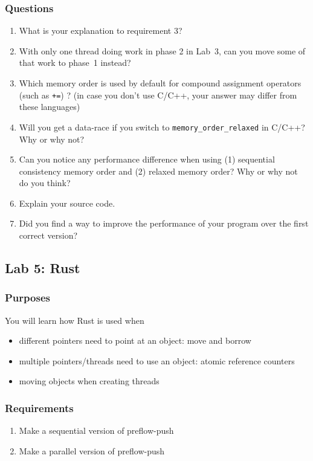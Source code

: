 \documentclass{forsete}
\begin{document}
\subsubsection*{Questions}
\begin{enumerate}
\item What is your explanation to requirement 3?
\item With only one thread doing work in phase 2 in Lab~3, can you move some of that work to phase~1 instead?
\item Which memory order is used by default for compound assignment operators (such as \verb.+=.) ?  (in case you don't use C/C++, your answer may differ from these languages)
\item Will you get a data-race if you switch to \verb.memory_order_relaxed. in C/C++? Why or why not?
\item Can you notice any performance difference when using (1) sequential consistency memory order
and (2) relaxed memory order? Why or why not do you think?
\item Explain your source code.
\item Did you find a way to improve the performance of your program over the first correct version?

\end{enumerate}

\newpage
\subsection*{Lab 5: Rust}
\subsubsection*{Purposes}
You will learn how Rust is used when
\begin{itemize}
\item different pointers need to point at an object: move and borrow
\item multiple pointers/threads need to use an object: atomic reference counters
\item moving objects when creating threads
\end{itemize}

\subsubsection*{Requirements}
\begin{enumerate}
\item Make a sequential version of preflow-push
\item Make a parallel version of preflow-push
\end{enumerate}
\end{document}
